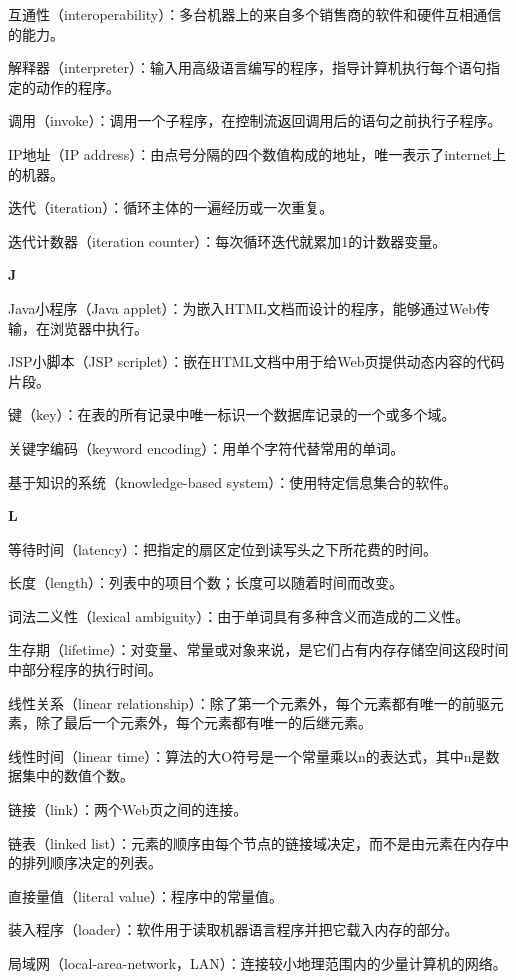 互通性（interoperability）：多台机器上的来自多个销售商的软件和硬件互相通信的能力。

解释器（interpreter）：输入用高级语言编写的程序，指导计算机执行每个语句指定的动作的程序。

调用（invoke）：调用一个子程序，在控制流返回调用后的语句之前执行子程序。

IP地址（IP address）：由点号分隔的四个数值构成的地址，唯一表示了internet上的机器。

迭代（iteration）：循环主体的一遍经历或一次重复。

迭代计数器（iteration counter）：每次循环迭代就累加1的计数器变量。

\textbf{J}

Java小程序（Java applet）：为嵌入HTML文档而设计的程序，能够通过Web传输，在浏览器中执行。

JSP小脚本（JSP scriplet）：嵌在HTML文档中用于给Web页提供动态内容的代码片段。

键（key）：在表的所有记录中唯一标识一个数据库记录的一个或多个域。

关键字编码（keyword encoding）：用单个字符代替常用的单词。

基于知识的系统（knowledge-based system）：使用特定信息集合的软件。

\textbf{L}

等待时间（latency）：把指定的扇区定位到读写头之下所花费的时间。

长度（length）：列表中的项目个数；长度可以随着时间而改变。

词法二义性（lexical ambiguity）：由于单词具有多种含义而造成的二义性。

生存期（lifetime）：对变量、常量或对象来说，是它们占有内存存储空间这段时间中部分程序的执行时间。

线性关系（linear relationship）：除了第一个元素外，每个元素都有唯一的前驱元素，除了最后一个元素外，每个元素都有唯一的后继元素。

线性时间（linear time）：算法的大O符号是一个常量乘以n的表达式，其中n是数据集中的数值个数。

链接（link）：两个Web页之间的连接。

链表（linked list）：元素的顺序由每个节点的链接域决定，而不是由元素在内存中的排列顺序决定的列表。

直接量值（literal value）：程序中的常量值。

装入程序（loader）：软件用于读取机器语言程序并把它载入内存的部分。

局域网（local-area-network，LAN）：连接较小地理范围内的少量计算机的网络。

